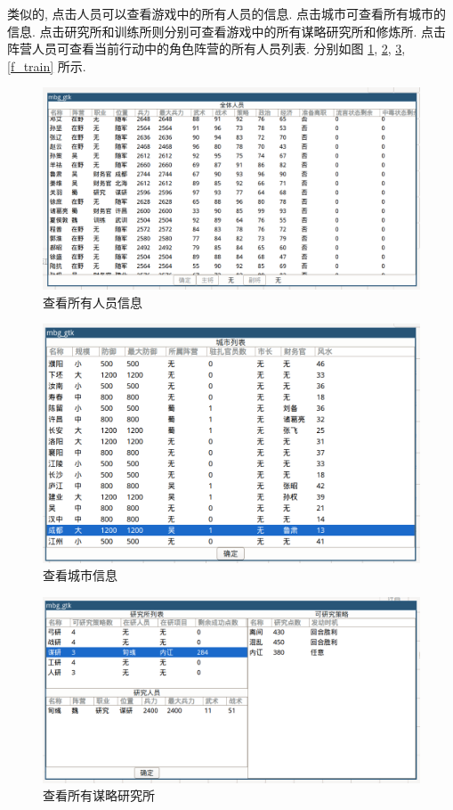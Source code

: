 \documentclass[UTF8, zihao=-4]{ctexart} %
\begin{document}
类似的, 点击人员可以查看游戏中的所有人员的信息. 点击城市可查看所有城市的信息.
点击研究所和训练所则分别可查看游戏中的所有谋略研究所和修炼所. 
点击阵营人员可查看当前行动中的角色阵营的所有人员列表. 分别如图 \ref{f_people}, \ref{f_city},
\ref{f_inst}, \ref{f_train} 所示.
\begin{figure}
    \centering
    \includegraphics[width=\textwidth]{f_people.png}
    \caption{\label{f_people}查看所有人员信息}
\end{figure}
\begin{figure}
    \centering
    \includegraphics[width=\textwidth]{f_city.png}
    \caption{\label{f_city}查看城市信息}
\end{figure}
\begin{figure}
    \centering
    \includegraphics[width=\textwidth]{f_inst.png}
    \caption{\label{f_inst}查看所有谋略研究所}
\end{figure}
\end{document}
